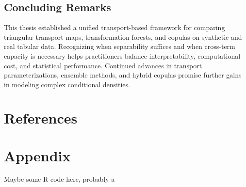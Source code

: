 \documentclass[11pt,a4paper,twoside]{book}\usepackage[]{graphicx}\usepackage[]{xcolor}
\begin{document}
\section{Concluding Remarks}

This thesis established a unified transport-based framework for comparing triangular transport maps, transformation forests, and copulas on synthetic and real tabular data. Recognizing when separability suffices and when cross-term capacity is necessary helps practitioners balance interpretability, computational cost, and statistical performance. Continued advances in transport parameterizations, ensemble methods, and hybrid copulas promise further gains in modeling complex conditional densities.





\chapter{References}\label{ch:refs}






\appendix




\chapter{Appendix}\label{ch:appendix}

Maybe some R code here, probably a 
\end{document}
